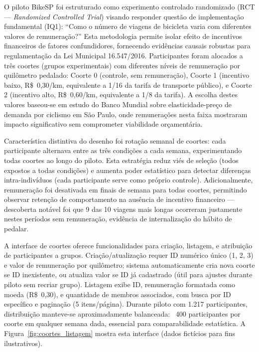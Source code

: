 

O piloto BikeSP foi estruturado como experimento controlado randomizado (RCT --- \textit{Randomized Controlled Trial}) visando responder questão de implementação fundamental (IQ1): ``Como o número de viagens de bicicleta varia com diferentes valores de remuneração?'' Esta metodologia permite isolar efeito de incentivos financeiros de fatores confundidores, fornecendo evidências causais robustas para regulamentação da Lei Municipal 16.547/2016. Participantes foram alocados a três coortes (grupos experimentais) com diferentes níveis de remuneração por quilômetro pedalado: Coorte 0 (controle, sem remuneração), Coorte 1 (incentivo baixo, R\$~0,30/km, equivalente a 1/16 da tarifa de transporte público), e Coorte 2 (incentivo alto, R\$~0,60/km, equivalente a 1/8 da tarifa). A escolha destes valores baseou-se em estudo do Banco Mundial sobre elasticidade-preço de demanda por ciclismo em São Paulo, onde remunerações nesta faixa mostraram impacto significativo sem comprometer viabilidade orçamentária.

Característica distintiva do desenho foi rotação semanal de coortes: cada participante alternava entre as três condições a cada semana, experimentando todas coortes ao longo do piloto. Esta estratégia reduz viés de seleção (todos expostos a todas condições) e aumenta poder estatístico para detectar diferenças intra-indivíduos (cada participante serve como próprio controle). Adicionalmente, remuneração foi desativada em finais de semana para todas coortes, permitindo observar retenção de comportamento na ausência de incentivo financeiro --- descoberta notável foi que 9 das 10 viagens mais longas ocorreram justamente nestes períodos sem remuneração, evidência de internalização do hábito de pedalar.

A interface de coortes oferece funcionalidades para criação, listagem, e atribuição de participantes a grupos. Criação/atualização requer ID numérico único (1, 2, 3) e valor de remuneração por quilômetro; sistema automaticamente cria nova coorte se ID inexistente, ou atualiza valor se ID já cadastrado (útil para ajustes durante piloto sem recriar grupo). Listagem exibe ID, remuneração formatada como moeda (R\$~0,30), e quantidade de membros associados, com busca por ID específico e paginação (5 itens/página). Durante piloto com 1.217 participantes, distribuição manteve-se aproximadamente balanceada: ~400 participantes por coorte em qualquer semana dada, essencial para comparabilidade estatística. A Figura~\ref{fig:coortes_listagem} mostra esta interface (dados fictícios para fins ilustrativos).


